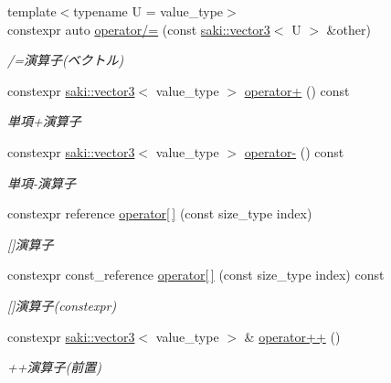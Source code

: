 \begin{DoxyCompactItemize}
{\footnotesize template$<$typename U  = value\+\_\+type$>$ }\\constexpr auto \mbox{\hyperlink{classsaki_1_1vector3_ad50fe15d3b66f8c90775b595ee0c7472}{operator/=}} (const \mbox{\hyperlink{classsaki_1_1vector3}{saki\+::vector3}}$<$ U $>$ \&other)
\begin{DoxyCompactList}\small\item\em /=演算子(ベクトル) \end{DoxyCompactList}\item 
constexpr \mbox{\hyperlink{classsaki_1_1vector3}{saki\+::vector3}}$<$ value\+\_\+type $>$ \mbox{\hyperlink{classsaki_1_1vector3_a8417faf227247d5062195eb6d8a513fc}{operator+}} () const
\begin{DoxyCompactList}\small\item\em 単項+演算子 \end{DoxyCompactList}\item 
constexpr \mbox{\hyperlink{classsaki_1_1vector3}{saki\+::vector3}}$<$ value\+\_\+type $>$ \mbox{\hyperlink{classsaki_1_1vector3_a6b8e1173064629de9e97c63f718d0a74}{operator-\/}} () const
\begin{DoxyCompactList}\small\item\em 単項-\/演算子 \end{DoxyCompactList}\item 
constexpr reference \mbox{\hyperlink{classsaki_1_1vector3_aa6b26c430b47bc51d614bd55ba636b7f}{operator\mbox{[}$\,$\mbox{]}}} (const size\+\_\+type index)
\begin{DoxyCompactList}\small\item\em \mbox{[}\mbox{]}演算子 \end{DoxyCompactList}\item 
constexpr const\+\_\+reference \mbox{\hyperlink{classsaki_1_1vector3_a540ef290a40ceb4023b1f5153eee7da6}{operator\mbox{[}$\,$\mbox{]}}} (const size\+\_\+type index) const
\begin{DoxyCompactList}\small\item\em \mbox{[}\mbox{]}演算子(constexpr) \end{DoxyCompactList}\item 
constexpr \mbox{\hyperlink{classsaki_1_1vector3}{saki\+::vector3}}$<$ value\+\_\+type $>$ \& \mbox{\hyperlink{classsaki_1_1vector3_afa127eca73c7de76a82bb158e78c1d70}{operator++}} ()
\begin{DoxyCompactList}\small\item\em ++演算子(前置) \end{DoxyCompactList}\item 

\end{DoxyCompactItemize}
